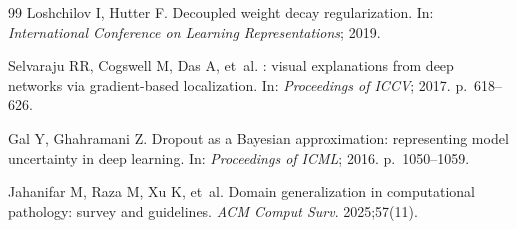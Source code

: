 \documentclass[10pt,a4paper,twocolumn]{article}
\begin{document}
\begin{thebibliography}{99}
Loshchilov I, Hutter F.
\newblock Decoupled weight decay regularization.
\newblock In: \emph{International Conference on Learning Representations};
  2019.

Selvaraju RR, Cogswell M, Das A, et~al.
: visual explanations from deep networks via
  gradient-based localization.
\newblock In: \emph{Proceedings of ICCV}; 2017. p.~618--626.

Gal Y, Ghahramani Z.
\newblock Dropout as a {Bayesian} approximation: representing model uncertainty
  in deep learning.
\newblock In: \emph{Proceedings of ICML}; 2016. p.~1050--1059.

Jahanifar M, Raza M, Xu K, et~al.
\newblock Domain generalization in computational pathology: survey and
  guidelines.
\newblock \emph{ACM Comput Surv}. 2025;57(11).

\end{thebibliography}
\end{document}

